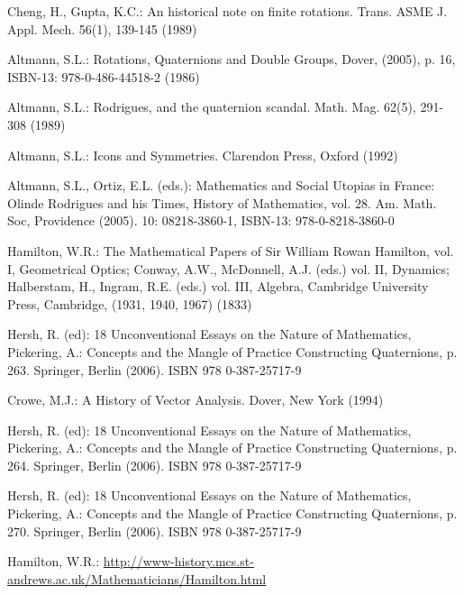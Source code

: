\begin{thebibliography}{99}
     Cheng, H., Gupta, K.C.: An historical note on finite rotations. Trans. ASME J. Appl. Mech. 56(1), 139-145 (1989)

     Altmann, S.L.: Rotations, Quaternions and Double Groups, Dover, (2005), p. 16, ISBN-13: 978-0-486-44518-2 (1986)

     Altmann, S.L.: Rodrigues, and the quaternion scandal. Math. Mag. 62(5), 291-308 (1989)

     Altmann, S.L.: Icons and Symmetries. Clarendon Press, Oxford (1992)

     Altmann, S.L., Ortiz, E.L. (eds.): Mathematics and Social Utopias in France: Olinde Rodrigues and his Times, History of Mathematics, vol. 28. Am. Math. Soc, Providence (2005). 10: 08218-3860-1, ISBN-13: 978-0-8218-3860-0

     Hamilton, W.R.: The Mathematical Papers of Sir William Rowan Hamilton, vol. I, Geometrical Optics; Conway, A.W., McDonnell, A.J. (eds.) vol. II, Dynamics; Halberstam, H., Ingram, R.E. (eds.) vol. III, Algebra, Cambridge University Press, Cambridge, (1931, 1940, 1967) (1833)

     Hersh, R. (ed): 18 Unconventional Essays on the Nature of Mathematics, Pickering, A.: Concepts and the Mangle of Practice Constructing Quaternions, p. 263. Springer, Berlin (2006). ISBN 978 0-387-25717-9

     Crowe, M.J.: A History of Vector Analysis. Dover, New York (1994)

     Hersh, R. (ed): 18 Unconventional Essays on the Nature of Mathematics, Pickering, A.: Concepts and the Mangle of Practice Constructing Quaternions, p. 264. Springer, Berlin (2006). ISBN 978 0-387-25717-9

     Hersh, R. (ed): 18 Unconventional Essays on the Nature of Mathematics, Pickering, A.: Concepts and the Mangle of Practice Constructing Quaternions, p. 270. Springer, Berlin (2006). ISBN 978 0-387-25717-9

     Hamilton, W.R.: \href{http://www-history.mcs.st-andrews.ac.uk/Mathematicians/Hamilton.html}{http://www-history.mcs.st-andrews.ac.uk/Mathematicians/Hamilton.html}


\end{thebibliography}
